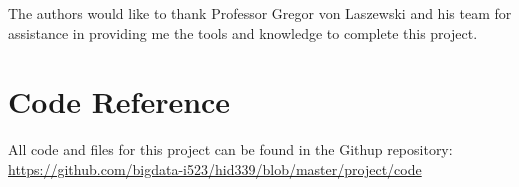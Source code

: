 \documentclass[sigconf]{acmart}
\begin{document}
\begin{acks}
The authors would like to thank Professor Gregor von Laszewski and his team for assistance in providing me the tools and knowledge to complete this project.
\end{acks}


 


\newpage
\appendix
\section{Code Reference}
All code and files for this project can be found in the Githup repository:
\url{https://github.com/bigdata-i523/hid339/blob/master/project/code}
\end{document}
